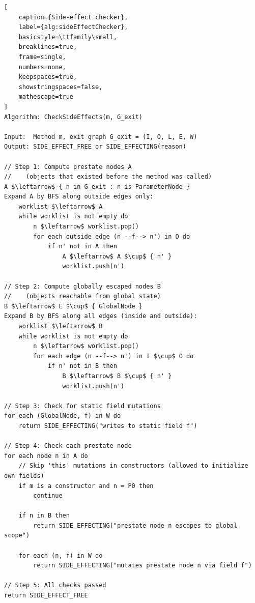 \begin{lstlisting}[
    caption={Side-effect checker}, 
    label={alg:sideEffectChecker},
    basicstyle=\ttfamily\small,
    breaklines=true,
    frame=single,
    numbers=none,
    keepspaces=true,
    showstringspaces=false,
    mathescape=true
]
Algorithm: CheckSideEffects(m, G_exit)

Input:  Method m, exit graph G_exit = (I, O, L, E, W)
Output: SIDE_EFFECT_FREE or SIDE_EFFECTING(reason)

// Step 1: Compute prestate nodes A
//    (objects that existed before the method was called)
A $\leftarrow$ { n in G_exit : n is ParameterNode }
Expand A by BFS along outside edges only:
    worklist $\leftarrow$ A
    while worklist is not empty do
        n $\leftarrow$ worklist.pop()
        for each outside edge (n --f--> n') in O do
            if n' not in A then
                A $\leftarrow$ A $\cup$ { n' }
                worklist.push(n')

// Step 2: Compute globally escaped nodes B
//    (objects reachable from global state)
B $\leftarrow$ E $\cup$ { GlobalNode }
Expand B by BFS along all edges (inside and outside):
    worklist $\leftarrow$ B
    while worklist is not empty do
        n $\leftarrow$ worklist.pop()
        for each edge (n --f--> n') in I $\cup$ O do
            if n' not in B then
                B $\leftarrow$ B $\cup$ { n' }
                worklist.push(n')

// Step 3: Check for static field mutations
for each (GlobalNode, f) in W do
    return SIDE_EFFECTING("writes to static field f")

// Step 4: Check each prestate node
for each node n in A do
    // Skip 'this' mutations in constructors (allowed to initialize own fields)
    if m is a constructor and n = P0 then
        continue

    if n in B then
        return SIDE_EFFECTING("prestate node n escapes to global scope")

    for each (n, f) in W do
        return SIDE_EFFECTING("mutates prestate node n via field f")

// Step 5: All checks passed
return SIDE_EFFECT_FREE
\end{lstlisting}
